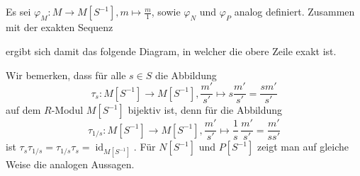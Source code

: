 \documentclass[a4paper,10pt]{article}
\theoremstyle{definition}
\newcommand{\id}{\operatorname{id}}
\begin{document}
\subsection{}
Es sei $\varphi_M : M \rightarrow M[S^{-1}], m \mapsto \frac{m}{1}$, sowie  $\varphi_N$ und $\varphi_P$ analog definiert. Zusammen mit der exakten Sequenz
\begin{center}
\end{center}
ergibt sich damit das folgende Diagram, in welcher die obere Zeile exakt ist.
\begin{center}
\end{center}

Wir bemerken, dass für alle $s \in S$ die Abbildung
\[
 \tau_s: M[S^{-1}] \rightarrow M[S^{-1}], \frac{m'}{s'} \mapsto s \frac{m'}{s'} = \frac{sm'}{s'}
\]
auf dem $R$-Modul $M[S^{-1}]$ bijektiv ist, denn für die Abbildung
\[
 \tau_{1/s} : M[S^{-1}] \rightarrow M[S^{-1}], \frac{m'}{s'} \mapsto \frac{1}{s} \, \frac{m'}{s'} = \frac{m'}{ss'}
\]
ist $\tau_s \tau_{1/s} = \tau_{1/s} \tau_s = \id_{M[S^{-1}]}$. Für $N[S^{-1}]$ und $P[S^{-1}]$ zeigt man auf gleiche Weise die analogen Aussagen.
\end{document}

